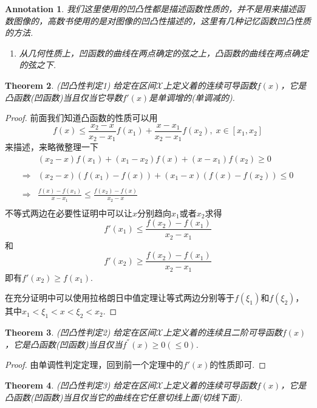 \documentclass{article}
\newtheorem{theorem}{Theorem}[section]
\newtheorem{annotation}[theorem]{Annotation}
\begin{document}
\begin{annotation}
\rm 我们这里使用的凹凸性都是描述函数性质的，并不是用来描述函数图像的，{\color{red}高数书使用的是对图像的凹凸性描述的}，这里有几种记忆函数凹凸性质的方法.
\begin{enumerate}
	\item 从几何性质上，凹函数的曲线在两点确定的弦之上，凸函数的曲线在两点确定的弦之下.
\end{enumerate}	
\end{annotation}

\begin{theorem}
\rm {\color{red} (凹凸性判定1)} 给定在区间$\mathcal{X}$上定义着的连续可导函数$f(x)$，它是凸函数(凹函数)当且仅当它导数$f'(x)$是单调增的(单调减的). 
\end{theorem}

\begin{proof}
前面我们知道凸函数的性质可以用
$$
f(x) \leq \frac{x_2 - x}{x_2-x_1}f(x_1) + \frac{x-x_1}{x_2-x_1}f(x_2),\; x \in [x_1,x_2]
$$
来描述，来略微整理一下
$$
\begin{array}{ll}
&(x_2-x)f(x_1) + (x_1-x_2)f(x) + (x-x_1)f(x_2) \geq 0 \\ \\
\Rightarrow & (x_2 - x)(f(x_1)-f(x)) + (x_1 -x)(f(x)-f(x_2)) \leq  0 \\ \\
\Rightarrow & \frac{f(x) - f(x_1)}{x -x_1} \leq \frac{f(x_2) - f(x)}{x_2 - x} \\
\end{array}
$$
不等式两边在必要性证明中可以让$x$分别趋向$x_1$或者$x_2$求得
$$
f'(x_1) \leq \frac{f(x_2) - f(x_1)}{x_2 - x_1}
$$
和 
$$
f'(x_2) \geq \frac{f(x_2) - f(x_1)}{x_2 - x_1} 
$$
即有$f'(x_2) \geq f(x_1)$.

在充分证明中可以使用拉格朗日中值定理让等式两边分别等于$f(\xi_1)$和$f(\xi_2)$，其中$x_1 < \xi_1 < x < \xi_2 < x_2$.
\end{proof}


\begin{theorem}
\rm {\color{red} (凹凸性判定2)} 给定在区间$\mathcal{X}$上定义着的连续且二阶可导函数$f(x)$，它是凸函数(凹函数)当且仅当$f^{''}(x) \geq 0(\leq 0)$.
\end{theorem}

\begin{proof}
由单调性判定定理，回到前一个定理中的$f'(x)$的性质即可.
\end{proof}

\begin{theorem}
\rm {\color{red} (凹凸性判定3)} 给定在区间$\mathcal{X}$上定义着的连续可导函数$f(x)$，它是凸函数(凹函数)当且仅当它的曲线在它任意切线上面(切线下面).
\end{theorem}
\end{document}
